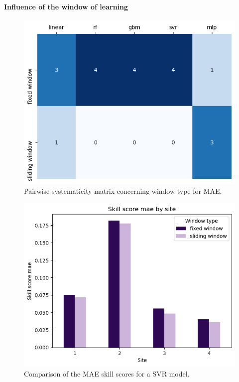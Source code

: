 \paragraph{Influence of the window of learning}

\begin{figure}[htb!]
    \centering
    \includegraphics[width=\columnwidth]{figures/first_study/comp_window_mae.png}
\caption{Pairwise systematicity matrix concerning window type for MAE.}
\end{figure}

\begin{figure}[htb!]
    \centering
    \includegraphics[width=\columnwidth]{figures/first_study/comp_window_mae_svr.png}
\caption{Comparison of the MAE skill scores for a SVR model.}
\end{figure}

